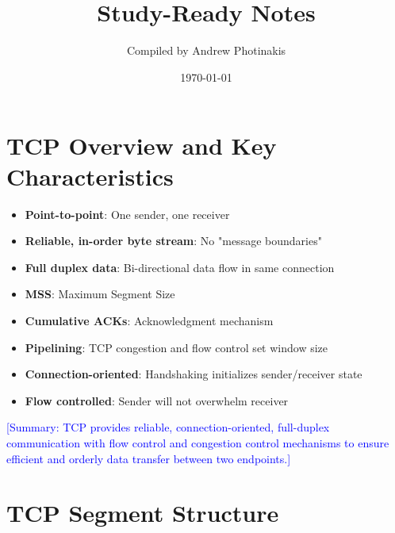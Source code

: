 \documentclass[12pt]{article}
\title{\TOPICTITLE\\\large Study-Ready Notes}
\author{Compiled by Andrew Photinakis}
\date{\today}
\begin{document}
\maketitle
\tableofcontents
\newpage


\section{TCP Overview and Key Characteristics}

\begin{itemize}
    \item \textbf{Point-to-point}: One sender, one receiver
    \item \textbf{Reliable, in-order byte stream}: No "message boundaries"
    \item \textbf{Full duplex data}: Bi-directional data flow in same connection
    \item \textbf{MSS}: Maximum Segment Size
    \item \textbf{Cumulative ACKs}: Acknowledgment mechanism
    \item \textbf{Pipelining}: TCP congestion and flow control set window size
    \item \textbf{Connection-oriented}: Handshaking initializes sender/receiver state
    \item \textbf{Flow controlled}: Sender will not overwhelm receiver
\end{itemize}

\textcolor{blue}{[Summary: TCP provides reliable, connection-oriented, full-duplex communication with flow control and congestion control mechanisms to ensure efficient and orderly data transfer between two endpoints.]}

\section{TCP Segment Structure}
\end{document}

